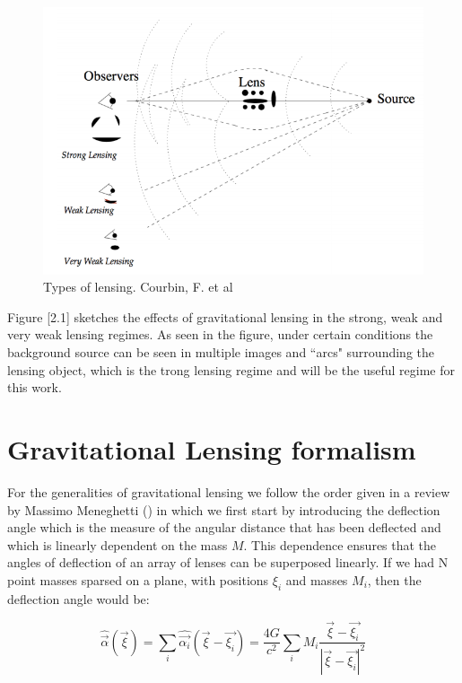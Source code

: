 \begin{figure}[H]
\centering
\includegraphics[width=12cm]{images/types_of_lensing.png}
\caption[Types of lensing]{Types of lensing. Courbin, F. et al \citeyear{Reference24}}
\end{figure}

Figure [2.1] sketches the effects of gravitational lensing in the strong, weak and very weak lensing regimes. As seen in the figure, under certain conditions the background source can be seen in multiple images and ``arcs" surrounding the lensing object, which is the trong lensing regime and will be the useful regime for this work. 

\section{Gravitational Lensing formalism}

For the generalities of gravitational lensing we follow the order given in a review by Massimo Meneghetti (\citeyear{Reference26}) in which we first start by introducing the deflection angle which is the measure of the angular distance that has been deflected and which is linearly dependent on the mass $M$. This dependence ensures that the angles of deflection of an array of lenses can be superposed linearly. If we had N point masses sparsed on a plane, with positions $\xi_i$ and masses $M_{i}$, then the deflection angle would be:

\begin{equation}
\hat{\vec{\alpha}}(\vec{\xi})=\sum_{i}\hat{\vec{\alpha_{i}}}(\vec{\xi}-\vec{\xi_{i}})=\frac{4G}{c^{2}}\sum_{i}M_{i}\frac{\vec{\xi}-\vec{\xi_{i}}}{\left|\vec{\xi}-\vec{\xi_{i}}\right|^{2}}
\end{equation}


